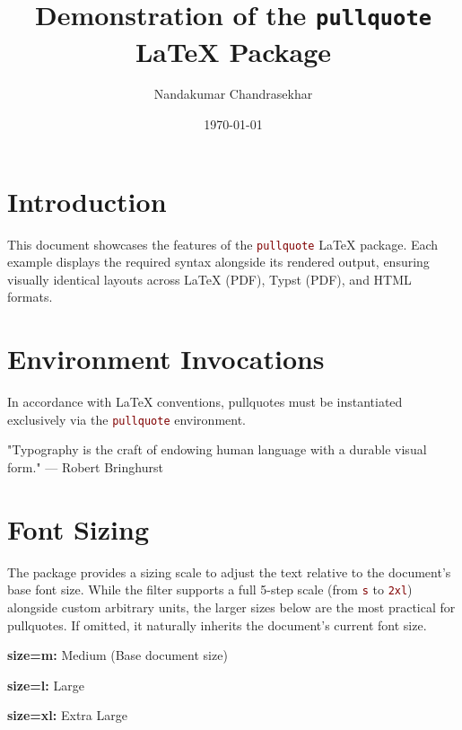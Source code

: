 \documentclass[12pt, a4paper]{article}
\title{Demonstration of the \texttt{pullquote} LaTeX Package}
\author{Nandakumar Chandrasekhar}
\date{\today}
\let\oldtexttt\texttt
\renewcommand{\texttt}[1]{\textcolor{Maroon}{\oldtexttt{#1}}}
\begin{document}
\maketitle


\section*{Introduction}

This document showcases the features of the \texttt{pullquote} LaTeX package. Each example displays the required syntax alongside its rendered output, ensuring visually identical layouts across LaTeX (PDF), Typst (PDF), and HTML formats.

\section*{Environment Invocations}

In accordance with LaTeX conventions, pullquotes must be instantiated exclusively via the \texttt{pullquote} environment.

\begin{pullquote}
"Typography is the craft of endowing human language with a durable visual form."
--- Robert Bringhurst
\end{pullquote}

\section*{Font Sizing}

The package provides a sizing scale to adjust the text relative to the document's base font size. While the filter supports a full 5-step scale (from \texttt{s} to \texttt{2xl}) alongside custom arbitrary units, the larger sizes below are the most practical for pullquotes. If omitted, it naturally inherits the document's current font size.

\begin{pullquote}[size=m]
\textbf{size=m:} Medium (Base document size)
\end{pullquote}

\begin{pullquote}[size=l]
\textbf{size=l:} Large
\end{pullquote}

\begin{pullquote}[size=xl]
\textbf{size=xl:} Extra Large
\end{pullquote}
\end{document}
